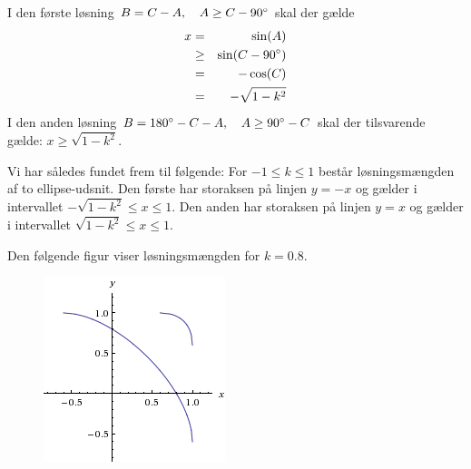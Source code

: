 \documentclass[12pt,oneside,a4paper]{article}
\newcommand{\bas}{\begin{eqnarray*}}
\newcommand{\eas}{\end{eqnarray*}}
\begin{document}
I den første løsning $B = C-A, \quad A \ge C-90\degree$ skal der gælde
\bas
x &=& \sin(A) \\
  &\ge& \sin(C-90\degree) \\
  &=& -\cos(C) \\
  &=& -\sqrt{1-k^2}
\eas
I den anden løsning $B = 180\degree - C - A, \quad A \ge 90\degree-C$
skal der tilsvarende gælde: $x \ge \sqrt{1-k^2}$.

Vi har således fundet frem til følgende: For $-1\le k \le 1$ består løsningsmængden af to ellipse-udsnit. Den første har storaksen på linjen $y=-x$ og gælder i intervallet $-\sqrt{1-k^2} \le x \le 1$. Den anden har storaksen på linjen $y=x$ og gælder i intervallet $\sqrt{1-k^2} \le x \le 1$.

Den følgende figur viser løsningsmængden for $k=0.8$.

\begin{figure}[ht]
\begin{center}
\includegraphics{opg6.png}
\label{fig1}
\end{center}
\end{figure}
\end{document}
